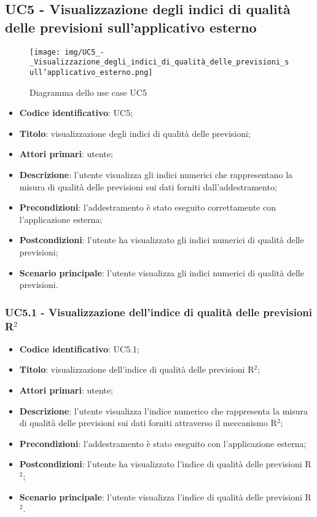 \subsection{UC5 - Visualizzazione degli indici di qualità delle previsioni sull'applicativo esterno}
\begin{figure}[H]
	\texttt{[image: img/UC5\_-\_Visualizzazione\_degli\_indici\_di\_qualità\_delle\_previsioni\_sull'applicativo\_esterno.png]}
	\caption{Diagramma dello use case UC5}
\end{figure}
\begin{itemize}
	\item \textbf{Codice identificativo}: UC5;
	\item \textbf{Titolo}: visualizzazione degli indici di qualità delle previsioni;
	\item \textbf{Attori primari}: utente;
	\item \textbf{Descrizione}: l'utente visualizza gli indici numerici che rappresentano la misura di qualità delle previsioni sui dati forniti dall'addestramento;
	\item \textbf{Precondizioni}: l'addestramento è stato eseguito correttamente con l'applicazione esterna;
	\item \textbf{Postcondizioni}: l'utente ha visualizzato gli indici numerici di qualità delle previsioni;
	\item \textbf{Scenario principale}: l'utente visualizza gli indici numerici di qualità delle previsioni.
\end{itemize} 
\subsubsection{UC5.1 - Visualizzazione dell'indice di qualità delle previsioni R$^{2}$}
\begin{itemize}
	\item \textbf{Codice identificativo}: UC5.1;
	\item \textbf{Titolo}: visualizzazione dell'indice di qualità delle previsioni R$^{2}$\glo;
	\item \textbf{Attori primari}: utente;
	\item \textbf{Descrizione}: l'utente visualizza l'indice numerico che rappresenta la misura di qualità delle previsioni sui dati forniti attraverso il meccanismo R$^{2}$\glo;
	\item \textbf{Precondizioni}: l'addestramento è stato eseguito con l'applicazione esterna;
	\item \textbf{Postcondizioni}: l'utente ha visualizzato l'indice di qualità delle previsioni R$^{2}$\glo;
	\item \textbf{Scenario principale}: l'utente visualizza l'indice di qualità delle previsioni R$^{2}$\glo.
\end{itemize} 
